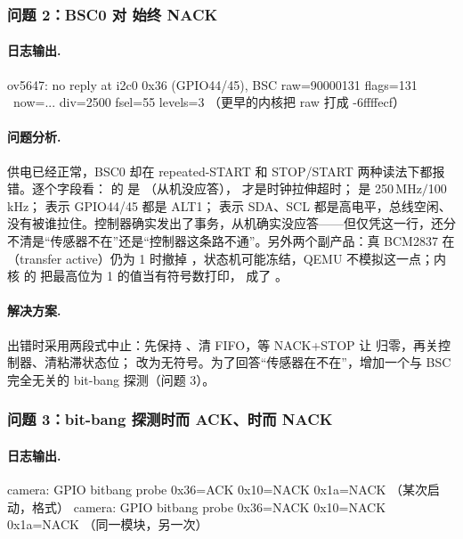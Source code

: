 \subsubsection{问题 2：BSC0 对  始终 NACK}

\paragraph{日志输出.}
\begin{txtcode}
ov5647: no reply at i2c0 0x36 (GPIO44/45), BSC raw=90000131 flags=131 \
        now=... div=2500 fsel=55 levels=3
（更早的内核把 raw 打成 -6ffffecf）
\end{txtcode}

\paragraph{问题分析.} 供电已经正常，BSC0 却在 repeated-START 和 STOP/START 两种读法下都报错。逐个字段看： 的  是 （从机没应答）， 才是时钟拉伸超时； 是 250\,MHz$/$100\,kHz； 表示 GPIO44/45 都是 ALT1； 表示 SDA、SCL 都是高电平，总线空闲、没有被谁拉住。控制器确实发出了事务，从机确实没应答——但仅凭这一行，还分不清是“传感器不在”还是“控制器这条路不通”。另外两个副产品：真 BCM2837 在 （transfer active）仍为 1 时撤掉 ，状态机可能冻结，QEMU 不模拟这一点；内核  的  把最高位为 1 的值当有符号数打印， 成了 。

\paragraph{解决方案.} 出错时采用两段式中止：先保持 、清 FIFO，等 NACK+STOP 让  归零，再关控制器、清粘滞状态位； 改为无符号。为了回答“传感器在不在”，增加一个与 BSC 完全无关的 bit-bang 探测（问题 3）。

\subsubsection{问题 3：bit-bang 探测时而 ACK、时而 NACK}

\paragraph{日志输出.}
\begin{txtcode}
camera: GPIO bitbang probe 0x36=ACK 0x10=NACK 0x1a=NACK        （某次启动，格式）
camera: GPIO bitbang probe 0x36=NACK 0x10=NACK 0x1a=NACK       （同一模块，另一次）
\end{txtcode}

